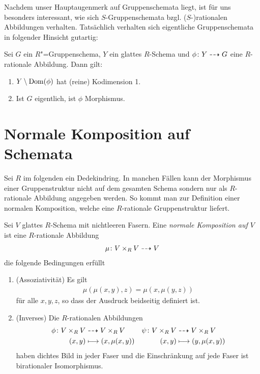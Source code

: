 \documentclass[german, bibliography=totoc]{scrreprt}
\begin{document}
Nachdem unser Hauptaugenmerk auf Gruppenschemata liegt, ist für uns
besonders interessant, wie sich $S$-Gruppenschemata
bzgl. ($S$-)rationalen Abbildungen verhalten.
Tatsächlich verhalten sich eigentliche Gruppenschemata in folgender
Hinsicht gutartig:
\begin{Lemma}
  \label{thm:rationalzumorphismus}
  Sei $G$ ein $R$"=Gruppenschema, $Y$ ein glattes $R$-Schema und
  $\phi\colon Y\dashrightarrow G$ eine $R$-rationale Abbildung.
  Dann gilt:
  \begin{enumerate}[label=(\roman*)]
  \item $Y\setminus \operatorname{Dom}(\phi)$ hat (reine) Kodimension 1.
  \item Ist $G$ eigentlich, ist $\phi$ Morphismus.
  \end{enumerate}
\end{Lemma}


\section{Normale Komposition auf Schemata}
Sei $R$ im folgenden ein Dedekindring.
In manchen Fällen kann der Morphismus einer Gruppenstruktur nicht auf
dem gesamten Schema sondern nur als $R$-rationale Abbildung angegeben
werden. So kommt man zur Definition einer normalen Komposition, welche
eine $R$-rationale Gruppenstruktur liefert.
\begin{Definition}\label{def:normalekomposition}
  Sei $V$ glattes $R$-Schema mit nichtleeren Fasern.
  Eine \emph{normale Komposition auf $V$} ist eine $R$-rationale
  Abbildung
  \begin{gather*}
    \mu\colon V\times_R V\dashrightarrow V
  \end{gather*}
  die folgende Bedingungen erfüllt
  \begin{enumerate}[label=(\alph*)]
  \item (Assoziativität) Es gilt
    \begin{gather*}
      \mu(\mu(x,y),z)=\mu(x,\mu(y,z))
    \end{gather*}
    für alle $x,y,z$, so dass der Ausdruck beidseitig definiert ist.
  \item (Inverses)
    Die $R$-rationalen Abbildungen
    \begin{align*}
      \phi\colon V\times_R V
      &\dashrightarrow V\times_R V
      &\psi\colon V\times_R V
      & \dashrightarrow V\times_R V\\
      (x,y)
      &\longmapsto (x,\mu(x,y))
      &(x,y)
      &\longmapsto (y,\mu(x,y))       
    \end{align*}
    haben dichtes Bild in jeder Faser und die Einschränkung auf jede
    Faser ist birationaler Isomorphismus.
  \end{enumerate}
\end{Definition}
\end{document}
